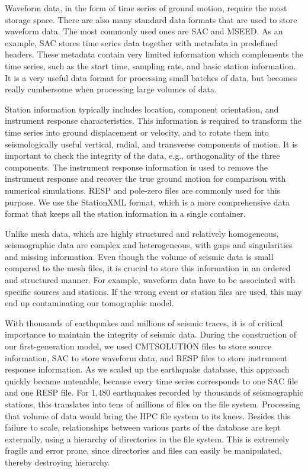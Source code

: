 Waveform data, in the form of time series of ground motion, require
the most storage space.
There are also many standard data formats that are used to store waveform
data.
The most commonly used ones are SAC and MSEED.
As an example, SAC stores time series data together with metadata
in predefined headers.
These metadata contain very limited information
which complements the time series, such as the start time, sampling rate,
and basic station
information.
It is a very useful data format for processing small batches of data, but becomes really cumbersome when processing
large volumes of data.

Station information typically includes location, component orientation, and instrument response characteristics.
This information is required to transform the time series into ground displacement or velocity, and to rotate them into seismologically useful vertical, radial, and transverse components of motion.
It is important to check the integrity of the data,
e.g., orthogonality of the three components.
The instrument response information is used to remove the instrument response and recover the true ground motion for comparison with numerical simulations.
RESP and pole-zero files are commonly used for this purpose.
We use the StationXML format,
which is a more comprehensive data format that keeps all the station information
in a single container.

Unlike mesh data, which are highly structured and relatively homogeneous,
seismographic data are complex and heterogeneous, with gaps and singularities and missing information.
Even though the volume of seismic data is small compared to the mesh files,
it is crucial to
store this information in an ordered and structured manner.
For example, 
waveform data have to be associated with specific sources and stations.
If the wrong
event or station files are used, this may end up contaminating our tomographic model.

With thousands of earthquakes and millions of seismic traces,
it is of critical importance to maintain the integrity of seismic data.
During the construction of our first-generation model,
we used CMTSOLUTION files to store source information,
SAC to store waveform data,
and RESP files to store instrument response information.
As we scaled up the earthquake database,
this approach quickly became untenable,
because every time series corresponds to one SAC file and one RESP file.
For 1,480 earthquakes recorded by thousands of seismographic stations,
this translates into tens of millions of files on the file system.
Processing that volume of data would bring the HPC file system to its knees.
Besides this failure to scale,
relationships between various parts of the database are kept externally,
using a hierarchy of directories in the file system.
This is extremely fragile and error prone,
since directories and files can easily be manipulated,
thereby destroying hierarchy.

